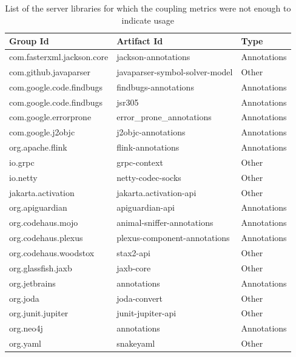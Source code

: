 \begin{table}[ht!]
\begin{center}
\begin{tabular}{|l|l|l|}
\hline
\textbf{Group Id} & \textbf{Artifact Id} & \textbf{Type} \\
\hline
com.fasterxml.jackson.core  & jackson-annotations             & Annotations \\\hline
com.github.javaparser       & javaparser-symbol-solver-model  & Other       \\\hline
com.google.code.findbugs    & findbugs-annotations            & Annotations \\\hline
com.google.code.findbugs    & jsr305                          & Annotations \\\hline
com.google.errorprone       & error\_prone\_annotations       & Annotations \\\hline
com.google.j2objc           & j2objc-annotations              & Annotations \\\hline
org.apache.flink            & flink-annotations               & Annotations \\\hline
io.grpc                     & grpc-context                    & Other       \\\hline
io.netty                    & netty-codec-socks               & Other       \\\hline
jakarta.activation          & jakarta.activation-api          & Other       \\\hline
org.apiguardian             & apiguardian-api                 & Annotations \\\hline
org.codehaus.mojo           & animal-sniffer-annotations      & Annotations \\\hline
org.codehaus.plexus         & plexus-component-annotations    & Annotations \\\hline
org.codehaus.woodstox       & stax2-api                       & Other       \\\hline
org.glassfish.jaxb          & jaxb-core                       & Other       \\\hline
org.jetbrains               & annotations                     & Annotations \\\hline
org.joda                    & joda-convert                    & Other       \\\hline
org.junit.jupiter           & junit-jupiter-api               & Other       \\\hline
org.neo4j                   & annotations                     & Annotations \\\hline
org.yaml                    & snakeyaml                       & Other       \\\hline
\end{tabular}
\end{center}
\caption{List of the server libraries for which the coupling metrics were not enough to indicate usage}
\label{table:significance-coupling}
\end{table}


